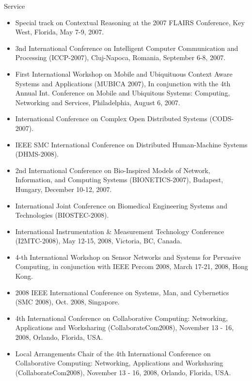 \begin{category}{Service}
\begin{itemize}
\item Special track on Contextual Reasoning at the 2007 FLAIRS Conference, Key West, Florida, May 7-9, 2007.

\item 3nd International Conference on Intelligent Computer Communication and Processing (ICCP-2007), Cluj-Napoca, Romania, September 6-8, 2007.

\item First International Workshop on Mobile and Ubiquituous Context Aware Systems and Applications (MUBICA 2007), In conjunction with the 4th Annual Int. Conference on Mobile and Ubiquitous Systems: Computing, Networking and Services, Philadelphia, August 6, 2007.

\item International Conference on Complex Open Distributed Systems (CODS-2007).

\item IEEE SMC International Conference on Distributed Human-Machine Systems (DHMS-2008).

\item 2nd International Conference on Bio-Inspired Models of Network, Information, and Computing Systems (BIONETICS-2007), Budapest, Hungary, December 10-12, 2007.

\item International Joint Conference on Biomedical Engineering Systems and Technologies (BIOSTEC-2008).

\item International Instrumentation \& Measurement Technology Conference (I2MTC-2008), May 12-15, 2008, Victoria, BC, Canada.

\item 4-th International Workshop on Sensor Networks and Systems for Pervasive Computing, in conjunction with IEEE Percom 2008, March 17-21, 2008, Hong Kong.

\item 2008 IEEE International Conference on Systems, Man, and Cybernetics (SMC 2008), Oct. 2008, Singapore.

\item 4th International Conference on Collaborative Computing: Networking, Applications and Worksharing (CollaborateCom2008), November 13 - 16, 2008, Orlando, Florida, USA.

\item Local Arrangements Chair of the 4th International
Conference on Collaborative Computing: Networking, Applications and
Worksharing (CollaborateCom2008), November 13 - 16, 2008, Orlando,
Florida, USA.



\end{itemize}
\end{category}
